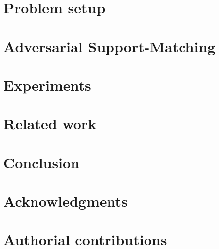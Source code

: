 \section{Problem setup}
\label{sec:problem-setup}


\section{Adversarial Support-Matching}
\label{sec:adversarialsm}


\section{Experiments}
\label{sec:exps}


\section{Related work}
\label{sec:related-work}


\section{Conclusion}
\label{sec:conclusion}


\section*{Acknowledgments}
\label{sec:ack}


\newpage


\clearpage
\section{Authorial contributions}

